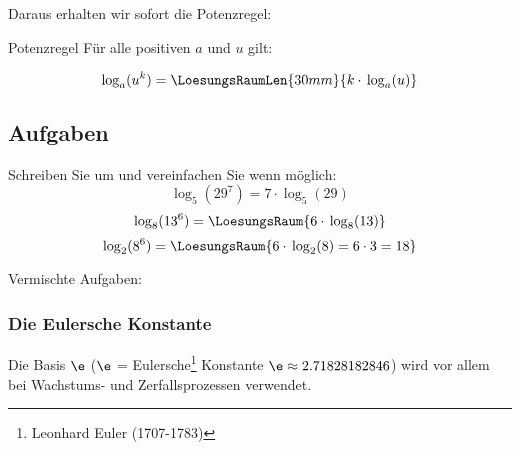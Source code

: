 
 Daraus erhalten wir sofort die Potenzregel:

 \begin{gesetz}{Potenzregel}{}
   Für alle positiven $a$ und $u$ gilt:

   $$\log_a(u^k) = \LoesungsRaumLen{30mm}{k\cdot{} \log_a(u)}$$
 \end{gesetz}
\newpage 

 \subsection*{Aufgaben}

 \begin{center}
 \end{center}

 Schreiben Sie um und vereinfachen Sie wenn möglich:
 $$\log_5(29^7) = 7\cdot{}\log_5(29)$$
 $$\log_8(13^6) = \LoesungsRaum{6\cdot{}\log_8(13)}$$
 $$\log_2(8^6) = \LoesungsRaum{6\cdot{}\log_2(8) = 6\cdot{} 3 = 18}$$
 


Vermischte Aufgaben:



\newpage

 




\newpage


\subsubsection{Die Eulersche Konstante}

Die Basis $\e$ ($\e$ = Eulersche\footnote{Leonhard Euler (1707-1783)} Konstante $\e\approx 2.71828182846$) wird vor allem bei Wachstums- und Zerfallsprozessen verwendet.

